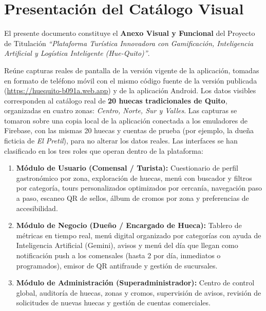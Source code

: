 \documentclass[11pt,a4paper]{article}
\begin{document}
\newpage
\section*{Presentación del Catálogo Visual}

El presente documento constituye el \textbf{Anexo Visual y Funcional} del Proyecto de Titulación \textit{``Plataforma Turística Innovadora con Gamificación, Inteligencia Artificial y Logística Inteligente (Hue-Quito)''}.

Reúne capturas reales de pantalla de la versión vigente de la aplicación, tomadas en formato de teléfono móvil con el mismo código fuente de la versión publicada (\url{https://huequito-b091a.web.app}) y de la aplicación Android. Los datos visibles corresponden al catálogo real de \textbf{20 huecas tradicionales de Quito}, organizadas en cuatro zonas: \textit{Centro, Norte, Sur y Valles}. Las capturas se tomaron sobre una copia local de la aplicación conectada a los emuladores de Firebase, con las mismas 20 huecas y cuentas de prueba (por ejemplo, la dueña ficticia de \textit{El Pretil}), para no alterar los datos reales. Las interfaces se han clasificado en los tres roles que operan dentro de la plataforma:

\begin{enumerate}[label=\textbf{\Roman*.}]
  \item \textbf{Módulo de Usuario (Comensal / Turista):} Cuestionario de perfil gastronómico por zona, exploración de huecas, menú con buscador y filtros por categoría, tours personalizados optimizados por cercanía, navegación paso a paso, escaneo QR de sellos, álbum de cromos por zona y preferencias de accesibilidad.
  \item \textbf{Módulo de Negocio (Dueño / Encargado de Hueca):} Tablero de métricas en tiempo real, menú digital organizado por categorías con ayuda de Inteligencia Artificial (Gemini), avisos y menú del día que llegan como notificación push a los comensales (hasta 2 por día, inmediatos o programados), emisor de QR antifraude y gestión de sucursales.
  \item \textbf{Módulo de Administración (Superadministrador):} Centro de control global, auditoría de huecas, zonas y cromos, supervisión de avisos, revisión de solicitudes de nuevas huecas y gestión de cuentas comerciales.
\end{enumerate}
\end{document}
